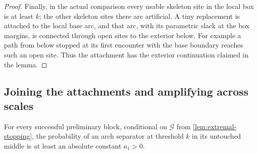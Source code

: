 \begin{proof}
Finally, in the actual comparison every usable skeleton site in the local
box is at least $k$; the other skeleton sites there are artificial.  A tiny
replacement is attached to the local base arc, and that arc, with its
parametric slack at the box margins, is connected through open sites to
the exterior below.  For example a path from below stopped at its first
encounter with the base boundary reaches such an open site.  Thus the
attachment has the exterior continuation claimed in the lemma.
\end{proof}

\subsection{Joining the attachments and amplifying across scales}

\begin{lemma}\label{lem:arch-upgrade}
For every successful preliminary block, conditional on $\mathcal G$ from
\cref{lem:extremal-stopping}, the probability of an arch separator at
threshold $k$ in its untouched middle is at least an absolute constant
$a_1>0$.
\end{lemma}

